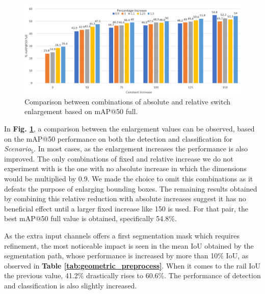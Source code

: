 \documentclass[conference]{IEEEtran}
\begin{document}
\begin{figure}[htb]
    \centering
	\centerline{\includegraphics[scale=0.6]{figures/switch_preprocessing2.png}}
	\caption{Comparison between combinations of absolute and relative switch enlargement based on mAP@50 full.}
	\label{fig:switch_enlargement_exp}
\end{figure}



In \textbf{Fig. \ref{fig:switch_enlargement_exp}}, a comparison between the enlargement values can be observed, based on the mAP@50 performance on both the detection and classification 
for \textit{Scenario}$_5$. 
In most cases, as the enlargement increases the performance is also improved. The only combinations of fixed and relative increase we do not experiment with is the one with no absolute increase in which the dimensions would be multiplied by 0.9. We made the choice to omit this combinations as it defeats the purpose of enlarging bounding boxes. The remaining results obtained by combining this relative reduction with absolute increases suggest it has no beneficial effect until a larger fixed increase like 150 is used. For that pair, the best mAP@50 full value is obtained, specifically 54.8\%. 

As the extra input channels offers a first segmentation mask which requires refinement, the most noticeable impact
is seen in the mean IoU obtained by the segmentation path, whose performance is increased by more than 10\% IoU, as observed in \textbf{Table \ref{tab:geometric_preprocess}}. When it comes to the rail IoU the previous value, 41.2\% drastically rises to 60.6\%.  The performance of detection and classification is also slightly increased.
\end{document}
